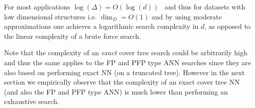 {	
}

For most applications $\log (\Delta) = O(\log(d))$~\cite{Navigating} and thus for datasets with low dimensional structures i.e. $\dim_D=O(1)$ and by using  moderate approximations one achieves a logarithmic search complexity in $d$, as opposed to the linear complexity of a brute force search.

Note that the complexity of an \emph{exact} cover tree search could be arbitrarily high 
and thus the same applies to the FP and PFP type ANN searches since they are also based on performing exact NN (on a truncated tree). However in the next section we empirically observe  that the complexity of an exact cover tree NN (and also the FP and PFP type ANN) is much lower than performing an exhaustive search.










